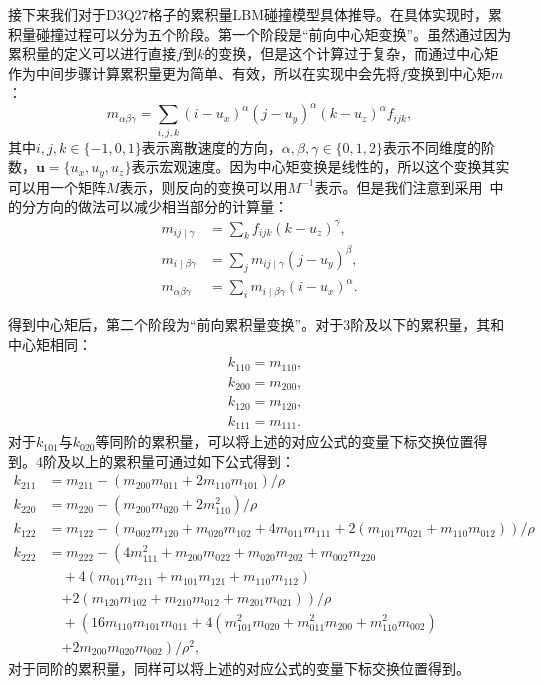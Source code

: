接下来我们对于D3Q27格子的累积量LBM碰撞模型具体推导。在具体实现时，累积量碰撞过程可以分为五个阶段。第一个阶段是“前向中心矩变换”。虽然通过因为累积量的定义可以进行直接$f$到$k$的变换，但是这个计算过于复杂，而通过中心矩作为中间步骤计算累积量更为简单、有效，所以在实现中会先将$f$变换到中心矩$m$：
\begin{equation}
m_{\alpha \beta \gamma} =\sum_{i,j,k} (i-u_x)^{\alpha} (j-u_y)^{\alpha} (k-u_z)^{\alpha} f_{ijk},
\end{equation}
其中$i, j, k \in \{-1, 0, 1\}$表示离散速度的方向，$\alpha, \beta, \gamma \in \{0, 1, 2\}$表示不同维度的阶数，$\boldsymbol{u}=\{u_x, u_y, u_z\}$表示宏观速度。因为中心矩变换是线性的，所以这个变换其实可以用一个矩阵$M$表示，则反向的变换可以用$M^{-1}$表示。但是我们注意到采用~\cite{Geier-2015}中的分方向的做法可以减少相当部分的计算量：
\begin{align*}
m_{i j \mid \gamma} & =\sum_{k} f_{ijk}(k-u_z)^{\gamma}, \\
m_{i \mid \beta \gamma} & =\sum_{j} m_{i j \mid \gamma}(j-u_y)^{\beta}, \\
m_{\alpha \beta \gamma} & =\sum_{i} m_{i \mid \beta \gamma}(i-u_x)^{\alpha}.
\end{align*}

得到中心矩后，第二个阶段为“前向累积量变换”。对于3阶及以下的累积量，其和中心矩相同：
\begin{align*}
& k_{110}=m_{110}, \\
& k_{200}=m_{200}, \\
& k_{120}=m_{120}, \\
& k_{111}=m_{111} .
\end{align*}
对于$k_{101}$与$k_{020}$等同阶的累积量，可以将上述的对应公式的变量下标交换位置得到。4阶及以上的累积量可通过如下公式得到：
\begin{align*}
k_{211} & =m_{211}-\left(m_{200} m_{011}+2 m_{110} m_{101}\right) / \rho \\
k_{220} & =m_{220}-\left(m_{200} m_{020}+2 m_{110}^{2}\right) / \rho \\
k_{122} & =m_{122}-\left(m_{002} m_{120}+m_{020} m_{102}+4 m_{011} m_{111}+2\left(m_{101} m_{021}+m_{110} m_{012}\right)\right) / \rho \\
k_{222} & =m_{222}-\left(4 m_{111}^{2}+m_{200} m_{022}+m_{020} m_{202}+m_{002} m_{220}\right. \\
&\quad +4\left(m_{011} m_{211}+m_{101} m_{121}+m_{110} m_{112}\right) \\
&\quad \left.+2\left(m_{120} m_{102}+m_{210} m_{012}+m_{201} m_{021}\right)\right) / \rho \\
&\quad +\left(16 m_{110} m_{101} m_{011}+4\left(m_{101}^{2} m_{020}+m_{011}^{2} m_{200}+m_{110}^{2} m_{002}\right)\right. \\
&\quad \left.+2 m_{200} m_{020} m_{002}\right) / \rho^{2} ,
\end{align*}
对于同阶的累积量，同样可以将上述的对应公式的变量下标交换位置得到。

